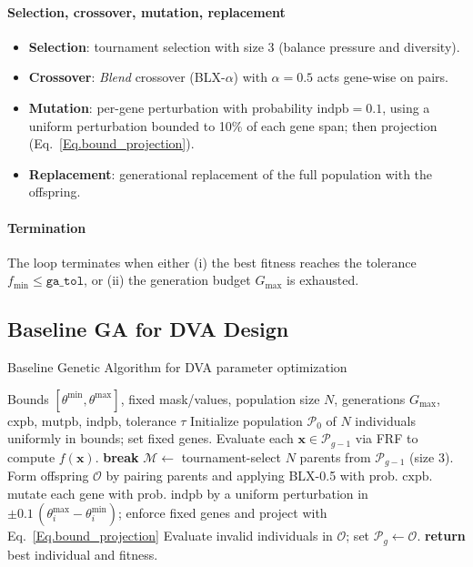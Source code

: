 \documentclass[12pt,a4paper]{article}
\begin{document}
    \paragraph{Selection, crossover, mutation, replacement}
    \begin{itemize}
        \item \textbf{Selection}: tournament selection with size 3 (balance pressure and diversity).
        \item \textbf{Crossover}: \emph{Blend} crossover (BLX-\(\alpha\)) with $\alpha=0.5$ acts gene-wise on pairs.
        \item \textbf{Mutation}: per-gene perturbation with probability $\mathrm{indpb}=0.1$, using a uniform perturbation bounded to 10\% of each gene span; then projection (Eq.~\ref{Eq.bound_projection}).
        \item \textbf{Replacement}: generational replacement of the full population with the offspring.
    \end{itemize}

    \paragraph{Termination}
    The loop terminates when either (i) the best fitness reaches the tolerance $f_{\min}\le\texttt{ga\_tol}$, or (ii) the generation budget $G_{\max}$ is exhausted.

    \subsection{Baseline GA for DVA Design}
    \begin{algorithm}[H]
    \caption{Baseline Genetic Algorithm for DVA parameter optimization}
    \begin{algorithmic}[1]
    \REQUIRE Bounds $[\theta^{\min},\theta^{\max}]$, fixed mask/values, population size $N$, generations $G_{\max}$, $\text{cxpb}$, $\text{mutpb}$, $\text{indpb}$, tolerance $\tau$
    \STATE Initialize population $\mathcal{P}_0$ of $N$ individuals uniformly in bounds; set fixed genes.
        \STATE Evaluate each $\mathbf{x}\in\mathcal{P}_{g-1}$ via FRF to compute $f(\mathbf{x})$.
         \textbf{break} \ENDIF
        \STATE $\mathcal{M}\leftarrow$ tournament-select $N$ parents from $\mathcal{P}_{g-1}$ (size 3).
        \STATE Form offspring $\mathcal{O}$ by pairing parents and applying BLX-0.5 with prob. $\text{cxpb}$.
             mutate each gene with prob. $\text{indpb}$ by a uniform perturbation in $\pm 0.1\,(\theta_i^{\max}-\theta_i^{\min})$; enforce fixed genes and project with Eq.~\eqref{Eq.bound_projection} \ENDIF
        \ENDFOR
        \STATE Evaluate invalid individuals in $\mathcal{O}$; set $\mathcal{P}_g\leftarrow\mathcal{O}$.
    \ENDFOR
    \STATE \textbf{return} best individual and fitness.
    \end{algorithmic}
    \end{algorithm}
\end{document}
